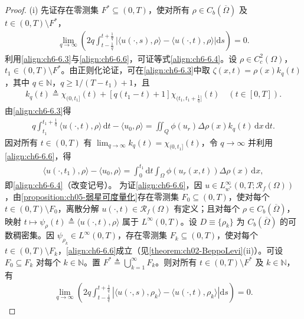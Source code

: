 \documentclass[../../main.tex]{subfiles}%
\begin{document}
\begin{proof}
(i) 先证存在零测集 $F^*\subseteq(0,T)$，使对所有 $\rho\in C_b(\overline\Omega)$ 及 $t\in(0,T)\setminus F^*$，
\begin{align}
\lim_{q\to\infty}\left(2q\int_{t-\frac{1}{q}}^{t+\frac{1}{q}}
\left|\langle u(\cdot,s),\rho\rangle-\langle u(\cdot,t),\rho\rangle\right|\mathrm{d}s\right)=0. \label{align:ch6-6.6}
\end{align}
利用\eqref{align:ch6-6.3}与\eqref{align:ch6-6.6}，可证等式\eqref{align:ch6-6.4}。设 $\rho\in C^2_c(\Omega)$，$t_1\in(0,T)\setminus F^*$。由正则化论证，可在\eqref{align:ch6-6.3}中取 $\zeta(x,t)=\rho(x)k_q(t)$，其中 $q\in\mathbb{N}$，$q\geqslant1/(T-t_1)+1$，且
\begin{align}
k_q(t)\triangleq \chi_{(0,t_1]}(t)+[q(t_1-t)+1]\chi_{(t_1,t_1+\frac{1}{q}]}(t) \quad(t\in[0,T]). \label{align:ch6-6.7}
\end{align}
由\eqref{align:ch6-6.3}得
\begin{align*}
q\int_{t_1}^{t_1+\frac{1}{q}}\langle u(\cdot,t),\rho\rangle\,\mathrm{d}t-\langle u_0,\rho\rangle
= \iint_Q\phi(u_r)\Delta\rho(x)k_q(t)\,\mathrm{d}x\,\mathrm{d}t.
\end{align*}
因对所有 $t\in(0,T)$ 有 $\lim_{q\to\infty}k_q(t)=\chi_{(0,t_1]}(t)$，令 $q\to\infty$ 并利用\eqref{align:ch6-6.6}，得
\begin{align*}
\langle u(\cdot,t_1),\rho\rangle-\langle u_0,\rho\rangle
= \int_0^{t_1}\mathrm{d}t\int_\Omega\phi(u_r(x,t))\Delta\rho(x)\,\mathrm{d}x,
\end{align*}
即\eqref{align:ch6-6.4}（改变记号）。
为证\eqref{align:ch6-6.6}，因 $u\in L^\infty_{w^*}(0,T;\mathscr{R}_f(\Omega))$，由\cref{proposition:ch05-弱星可度量化}存在零测集 $F_0\subseteq(0,T)$，使对每个 $t\in(0,T)\setminus F_0$，离散分解 $u(\cdot,t)\in\mathscr{R}_f(\Omega)$ 有定义；且对每个 $\rho\in C_b(\overline\Omega)$，映射 $t\mapsto\psi_\rho(t)\triangleq\langle u(\cdot,t),\rho\rangle$ 属于 $L^\infty(0,T)$。设 $D\equiv\{\rho_k\}$ 为 $C_b(\overline\Omega)$ 的可数稠密集。因 $\psi_{\rho_k}\in L^\infty(0,T)$，存在零测集 $F_k\subseteq(0,T)$，使对每个 $t\in(0,T)\setminus F_k$，\eqref{align:ch6-6.6}成立（见\cref{theorem:ch02-BeppoLevi}(ii)）。可设 $F_0\subseteq F_k$ 对每个 $k\in\mathbb{N}$。置 $F^*\triangleq\bigcup_{k=1}^\infty F_k$。则对所有 $t\in(0,T)\setminus F^*$ 及 $k\in\mathbb{N}$，有
\begin{align*}
\lim_{q\to\infty}\left(2q\int_{t-\frac{1}{q}}^{t+\frac{1}{q}}
\left|\langle u(\cdot,s),\rho_k\rangle-\langle u(\cdot,t),\rho_k\rangle\right|\mathrm{d}s\right)=0.

\end{align*}
\end{proof}
\end{document}
